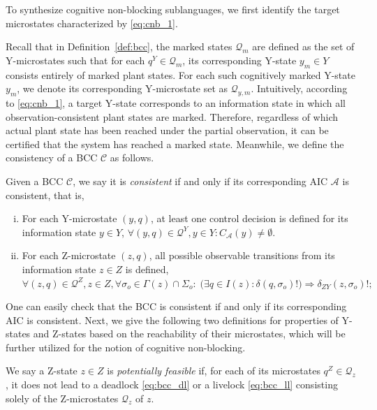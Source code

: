 \documentclass[journal,twoside,web]{ieeecolor}
\begin{document}
To synthesize cognitive non-blocking sublanguages, we first identify the
target microstates characterized by \eqref{eq:cnb_1}.

Recall that in Definition~\ref{def:bcc}, the marked states $\bm{\mathcal{Q}}_m$ are defined as the set of Y-microstates such that for each $q^Y \in \bm{\mathcal{Q}}_m$, its corresponding Y-state $y_m \in Y$ consists entirely of marked plant states. 
For each such cognitively marked Y-state $y_m$, we denote its corresponding Y-microstate set as $\bm{\mathcal{Q}}_{y,m}$.
%
Intuitively, according to \eqref{eq:cnb_1}, a target Y-state corresponds to an information state in which all observation-consistent plant states are marked. 
Therefore, regardless of which actual plant state has been reached under the partial observation, it can be certified that the system has reached a marked state.
%
Meanwhile, we define the consistency of a BCC $\mathcal{C}$ as follows.
%
\begin{definition}\label{def:con_bcc}
Given a BCC $\mathcal{C}$, we say it is \emph{consistent} if and only if its corresponding AIC $\mathcal{A}$ is consistent, that is,
\begin{enumerate}[(i)]
    \item For each Y-microstate $(y, q)$, at least one control decision is defined for its information state $y \in Y$, 
    $
    \forall (y, q) \in \bm{\mathcal{Q}}^Y, y \in Y : C_{\mathcal{A}}(y) \neq \emptyset
    $. 
    \item For each Z-microstate $(z, q)$, all possible observable transitions from its information state $z \in Z$ is defined, 
    $
    \forall (z, q) \in \bm{\mathcal{Q}}^Z, z \in Z, \forall \sigma_o \in \Gamma(z)\cap\Sigma_o:\;
    \big(\exists q \in I(z): \delta(q,\sigma_o)!\big) \Rightarrow \delta_{ZY}(z, \sigma_o)!;    
    $

\end{enumerate}
\end{definition}
%
One can easily check that the BCC is consistent if and only if its corresponding AIC is consistent.
%
Next, we give the following two definitions for properties of Y-states and Z-states based on the reachability of their microstates, which will be further utilized for the notion of cognitive non-blocking.
%
\begin{definition}
    We say a Z-state $z \in Z$ is \emph{potentially feasible} if, for each of its microstates $q^Z \in \bm{\mathcal{Q}}_z$, it does not lead to a deadlock \eqref{eq:bcc_dl} or a livelock \eqref{eq:bcc_ll} consisting solely of the Z-microstates $\bm{\mathcal{Q}}_z$ of $z$. 
\end{definition}
\end{document}
